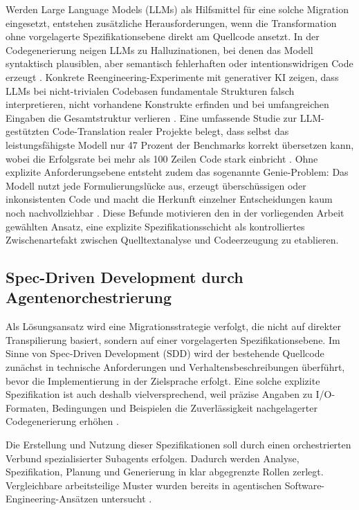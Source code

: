 Werden Large Language Models (LLMs) als Hilfsmittel für eine solche Migration eingesetzt, entstehen zusätzliche Herausforderungen, wenn die Transformation ohne vorgelagerte Spezifikationsebene direkt am Quellcode ansetzt. In der Codegenerierung neigen LLMs zu Halluzinationen, bei denen das Modell syntaktisch plausiblen, aber semantisch fehlerhaften oder intentionswidrigen Code erzeugt \parencite{liu2024hallucode}. Konkrete Reengineering-Experimente mit generativer KI zeigen, dass LLMs bei nicht-trivialen Codebasen fundamentale Strukturen falsch interpretieren, nicht vorhandene Konstrukte erfinden und bei umfangreichen Eingaben die Gesamtstruktur verlieren \parencite{acher2023splreengineering}. Eine umfassende Studie zur LLM-gestützten Code-Translation realer Projekte belegt, dass selbst das leistungsfähigste Modell nur 47 Prozent der Benchmarks korrekt übersetzen kann, wobei die Erfolgsrate bei mehr als 100 Zeilen Code stark einbricht \parencite{eniser2025realworld}. Ohne explizite Anforderungsebene entsteht zudem das sogenannte Genie-Problem: Das Modell nutzt jede Formulierungslücke aus, erzeugt überschüssigen oder inkonsistenten Code und macht die Herkunft einzelner Entscheidungen kaum noch nachvollziehbar \parencite{boeckeler2025autonomy}. Diese Befunde motivieren den in der vorliegenden Arbeit gewählten Ansatz, eine explizite Spezifikationsschicht als kontrolliertes Zwischenartefakt zwischen Quelltextanalyse und Codeerzeugung zu etablieren.

\subsection{Spec-Driven Development durch Agentenorchestrierung}

Als Lösungsansatz wird eine Migrationsstrategie verfolgt, die nicht auf direkter Transpilierung basiert, sondern auf einer vorgelagerten Spezifikationsebene. Im Sinne von Spec-Driven Development (SDD) wird der bestehende Quellcode zunächst in technische Anforderungen und Verhaltensbeschreibungen überführt, bevor die Implementierung in der Zielsprache erfolgt. Eine solche explizite Spezifikation ist auch deshalb vielversprechend, weil präzise Angaben zu I/O-Formaten, Bedingungen und Beispielen die Zuverlässigkeit nachgelagerter Codegenerierung erhöhen \parencite{midolo2026promptguidelines}.

Die Erstellung und Nutzung dieser Spezifikationen soll durch einen orchestrierten Verbund spezialisierter Subagents erfolgen. Dadurch werden Analyse, Spezifikation, Planung und Generierung in klar abgegrenzte Rollen zerlegt. Vergleichbare arbeitsteilige Muster wurden bereits in agentischen Software-Engineering-Ansätzen untersucht \parencite{qian2024chatdev,yang2024sweagent}.

